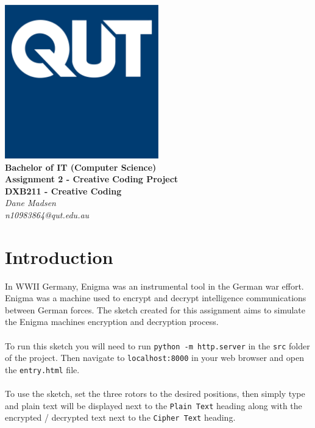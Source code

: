 \documentclass[12pt,a4paper]{article}
\begin{document}
	\begin{titlepage}
		
		\begin{center}
			\includegraphics[width=0.5\textwidth]{QUT.jpg}\\
			[0.03\textheight]  
			\Large\textbf{Bachelor of IT (Computer Science)}\\
			\Large\textbf{Assignment 2 - Creative Coding Project}\\
			\large\textbf{DXB211 - Creative Coding}\\
			[0.02\textheight]
			\large\textsl{Dane Madsen}\\
			\large\textsl{n10983864@qut.edu.au}
		\end{center}
		
	\end{titlepage}
	\tableofcontents
	\newpage

	\section{Introduction}
		In WWII Germany, Enigma was an instrumental tool in the German war effort. 
		Enigma was a machine used to encrypt and decrypt intelligence communications 
		between German forces. The sketch created for this assignment aims to simulate 
		the Enigma machines encryption and decryption process.\\
		\\
		To run this sketch you will need to run \texttt{python -m http.server} in the 
		\texttt{src} folder of the project. Then navigate to \texttt{localhost:8000} 
		in your web browser and open the \texttt{entry.html} file.\\
		\\
		To use the sketch, set the three rotors to the desired positions, then simply 
		type and plain text will be displayed next to the \texttt{Plain Text} heading along 
		with the encrypted / decrypted text next to the \texttt{Cipher Text} heading.\\
\end{document}

